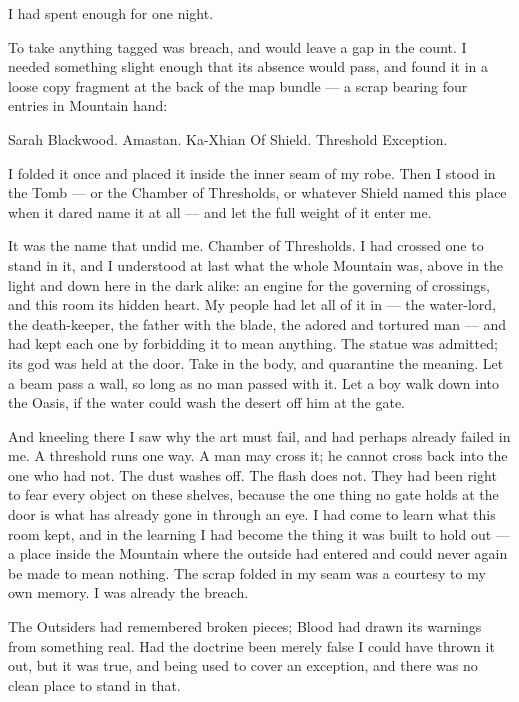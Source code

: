 I had spent enough for one night.\par

To take anything tagged was breach, and would leave a gap in the count. I needed something slight enough that its absence would pass, and found it in a loose copy fragment at the back of the map bundle --- a scrap bearing four entries in Mountain hand:\par

Sarah Blackwood. Amastan. Ka-Xhian Of Shield. Threshold Exception.\par

I folded it once and placed it inside the inner seam of my robe. Then I stood in the Tomb --- or the Chamber of Thresholds, or whatever Shield named this place when it dared name it at all --- and let the full weight of it enter me.\par

It was the name that undid me. Chamber of Thresholds. I had crossed one to stand in it, and I understood at last what the whole Mountain was, above in the light and down here in the dark alike: an engine for the governing of crossings, and this room its hidden heart. My people had let all of it in --- the water-lord, the death-keeper, the father with the blade, the adored and tortured man --- and had kept each one by forbidding it to mean anything. The statue was admitted; its god was held at the door. Take in the body, and quarantine the meaning. Let a beam pass a wall, so long as no man passed with it. Let a boy walk down into the Oasis, if the water could wash the desert off him at the gate.\par

And kneeling there I saw why the art must fail, and had perhaps already failed in me. A threshold runs one way. A man may cross it; he cannot cross back into the one who had not. The dust washes off. The flash does not. They had been right to fear every object on these shelves, because the one thing no gate holds at the door is what has already gone in through an eye. I had come to learn what this room kept, and in the learning I had become the thing it was built to hold out --- a place inside the Mountain where the outside had entered and could never again be made to mean nothing. The scrap folded in my seam was a courtesy to my own memory. I was already the breach.\par

The Outsiders had remembered broken pieces; Blood had drawn its warnings from something real. Had the doctrine been merely false I could have thrown it out, but it was true, and being used to cover an exception, and there was no clean place to stand in that.\par

